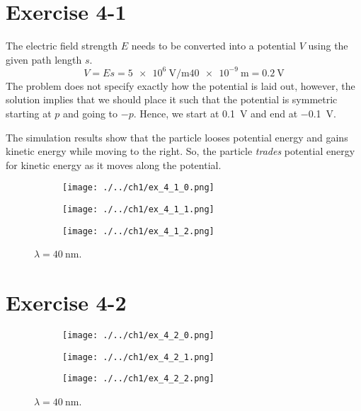 \clearpage



\newpage
\section{Exercise 4-1}

The electric field strength $E$ needs to be converted into a potential $V$
using the given path length $s$. 
\[
	V = E s
	  = \SI{5e6}{\volt\per\meter} \SI{40e-9}{\meter}
	  = \SI{0.2}{\volt}
\]
The problem does not specify exactly how the potential is laid out,
however, the solution implies that we should place it such that the
potential is symmetric starting at $p$ and going to $-p$. Hence,
we start at \SI{0.1}{\volt} and end at \SI{-0.1}{\volt}.

The simulation results show that the particle looses potential energy
and gains kinetic energy while moving to the right. So, the particle
\emph{trades} potential energy for kinetic energy as it moves along
the potential.

\begin{figure}
	\centering
	\begin{subfigure}{1\linewidth}
		\texttt{[image: ./../ch1/ex\_4\_1\_0.png]}
	\end{subfigure}
	
	\begin{subfigure}{1\linewidth}
		\texttt{[image: ./../ch1/ex\_4\_1\_1.png]}
	\end{subfigure}
	
	\begin{subfigure}{1\linewidth}
		\texttt{[image: ./../ch1/ex\_4\_1\_2.png]}
	\end{subfigure}
	
	\caption{$\lambda = \SI{40}{\nano\m}$.}
	\label{fig:ex_4_1}
\end{figure}

\clearpage



\newpage
\section{Exercise 4-2}

\begin{figure}
	\centering
	\begin{subfigure}{1\linewidth}
		\texttt{[image: ./../ch1/ex\_4\_2\_0.png]}
	\end{subfigure}
	
	\begin{subfigure}{1\linewidth}
		\texttt{[image: ./../ch1/ex\_4\_2\_1.png]}
	\end{subfigure}
	
	\begin{subfigure}{1\linewidth}
		\texttt{[image: ./../ch1/ex\_4\_2\_2.png]}
	\end{subfigure}
	
	\caption{$\lambda = \SI{40}{\nano\m}$.}
	\label{fig:ex_4_2}
\end{figure}

